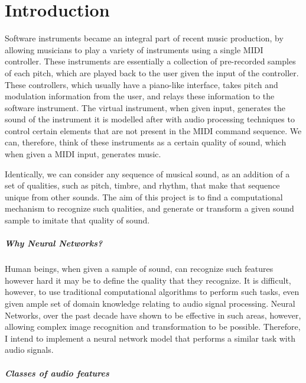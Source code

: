 \documentclass[12pt,a4paper,]{report}
\date{}
\begin{document}
\hypertarget{introduction}{%
\chapter{Introduction}\label{introduction}}

Software instruments became an integral part of recent music production,
by allowing musicians to play a variety of instruments using a single
MIDI controller. These instruments are essentially a collection of
pre-recorded samples of each pitch, which are played back to the user
given the input of the controller. These controllers, which usually have
a piano-like interface, takes pitch and modulation information from the
user, and relays these information to the software instrument. The
virtual instrument, when given input, generates the sound of the
instrument it is modelled after with audio processing techniques to
control certain elements that are not present in the MIDI command
sequence. We can, therefore, think of these instruments as a certain
quality of sound, which when given a MIDI input, generates music.

Identically, we can consider any sequence of musical sound, as an
addition of a set of qualities, such as pitch, timbre, and rhythm, that
make that sequence unique from other sounds. The aim of this project is
to find a computational mechanism to recognize such qualities, and
generate or transform a given sound sample to imitate that quality of
sound.

\paragraph{Why Neural Networks?}

Human beings, when given a sample of sound, can recognize such features
however hard it may be to define the quality that they recognize. It is
difficult, however, to use traditional computational algorithms to
perform such tasks, even given ample set of domain knowledge relating to
audio signal processing. Neural Networks, over the past decade have
shown to be effective in such areas, however, allowing complex image
recognition and transformation to be possible. Therefore, I intend to
implement a neural network model that performs a similar task with audio
signals.

\paragraph{Classes of audio features}
\end{document}

